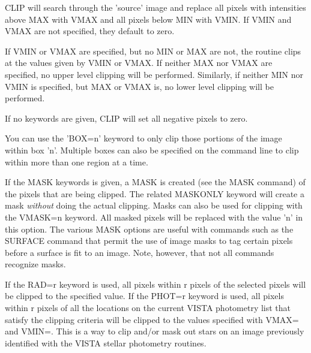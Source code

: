 CLIP will search through the 'source' image and replace all pixels with
intensities above MAX with VMAX and all pixels below MIN with VMIN.  If
VMIN and VMAX are not specified, they default to zero.

If VMIN or VMAX are specified, but no MIN or MAX are not, the routine clips
at the values given by VMIN or VMAX.  If neither MAX nor VMAX are
specified, no upper level clipping will be performed.  Similarly, if
neither MIN nor VMIN is specified, but MAX or VMAX is, no lower level
clipping will be performed. 

If no keywords are given, CLIP will set all negative pixels to
zero. 

You can use the 'BOX=n' keyword to only clip those portions of the image
within box 'n'.  Multiple boxes can also be specified on the command line
to clip within more than one region at a time.

If the MASK keywords is given, a MASK is created (see the MASK command) of
the pixels that are being clipped.  The related MASKONLY keyword will
create a mask \textit{without} doing the actual clipping.  Masks can also
be used for clipping with the VMASK=n keyword.  All masked pixels will be
replaced with the value 'n' in this option. The various MASK options are
useful with commands such as the SURFACE command that permit the use of
image masks to tag certain pixels before a surface is fit to an image.
Note, however, that not all commands recognize masks.

If the RAD=r keyword is used, all pixels within r pixels of the selected
pixels will be clipped to the specified value. If the PHOT=r keyword is
used, all pixels within r pixels of all the locations on the current VISTA
photometry list that satisfy the clipping criteria will be clipped to the
values specified with VMAX= and VMIN=.  This is a way to clip and/or mask
out stars on an image previously identified with the VISTA stellar
photometry routines.

